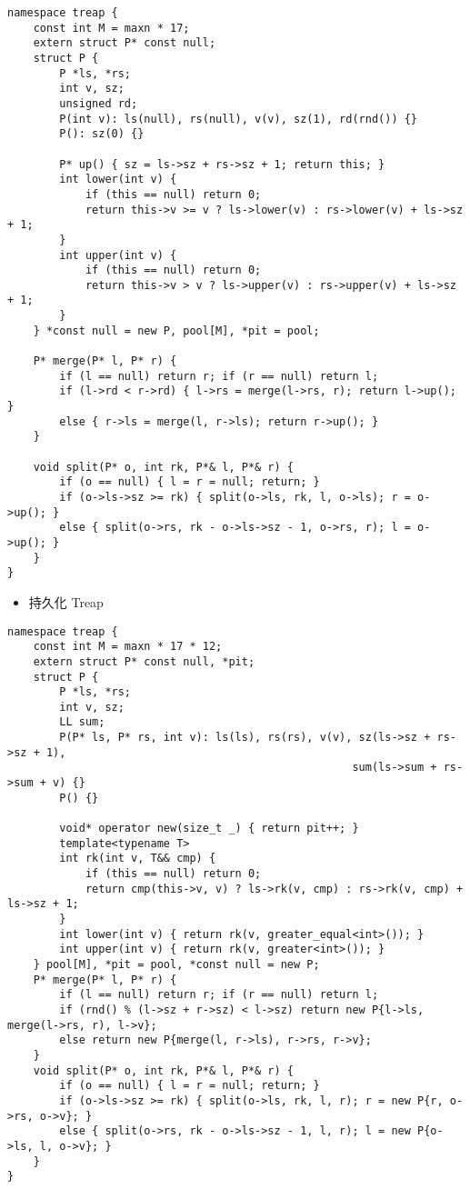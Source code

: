 \documentclass[]{article}
\providecommand{\tightlist}{%
  \setlength{\itemsep}{0pt}\setlength{\parskip}{0pt}}
\begin{document}
\begin{verbatim}
namespace treap {
    const int M = maxn * 17;
    extern struct P* const null;
    struct P {
        P *ls, *rs;
        int v, sz;
        unsigned rd;
        P(int v): ls(null), rs(null), v(v), sz(1), rd(rnd()) {}
        P(): sz(0) {}

        P* up() { sz = ls->sz + rs->sz + 1; return this; }
        int lower(int v) {
            if (this == null) return 0;
            return this->v >= v ? ls->lower(v) : rs->lower(v) + ls->sz + 1;
        }
        int upper(int v) {
            if (this == null) return 0;
            return this->v > v ? ls->upper(v) : rs->upper(v) + ls->sz + 1;
        }
    } *const null = new P, pool[M], *pit = pool;

    P* merge(P* l, P* r) {
        if (l == null) return r; if (r == null) return l;
        if (l->rd < r->rd) { l->rs = merge(l->rs, r); return l->up(); }
        else { r->ls = merge(l, r->ls); return r->up(); }
    }

    void split(P* o, int rk, P*& l, P*& r) {
        if (o == null) { l = r = null; return; }
        if (o->ls->sz >= rk) { split(o->ls, rk, l, o->ls); r = o->up(); }
        else { split(o->rs, rk - o->ls->sz - 1, o->rs, r); l = o->up(); }
    }
}
\end{verbatim}

\begin{itemize}
\tightlist
\item
  持久化 Treap
\end{itemize}

\begin{verbatim}
namespace treap {
    const int M = maxn * 17 * 12;
    extern struct P* const null, *pit;
    struct P {
        P *ls, *rs;
        int v, sz;
        LL sum;
        P(P* ls, P* rs, int v): ls(ls), rs(rs), v(v), sz(ls->sz + rs->sz + 1),
                                                     sum(ls->sum + rs->sum + v) {}
        P() {}

        void* operator new(size_t _) { return pit++; }
        template<typename T>
        int rk(int v, T&& cmp) {
            if (this == null) return 0;
            return cmp(this->v, v) ? ls->rk(v, cmp) : rs->rk(v, cmp) + ls->sz + 1;
        }
        int lower(int v) { return rk(v, greater_equal<int>()); }
        int upper(int v) { return rk(v, greater<int>()); }
    } pool[M], *pit = pool, *const null = new P;
    P* merge(P* l, P* r) {
        if (l == null) return r; if (r == null) return l;
        if (rnd() % (l->sz + r->sz) < l->sz) return new P{l->ls, merge(l->rs, r), l->v};
        else return new P{merge(l, r->ls), r->rs, r->v};
    }
    void split(P* o, int rk, P*& l, P*& r) {
        if (o == null) { l = r = null; return; }
        if (o->ls->sz >= rk) { split(o->ls, rk, l, r); r = new P{r, o->rs, o->v}; }
        else { split(o->rs, rk - o->ls->sz - 1, l, r); l = new P{o->ls, l, o->v}; }
    }
}
\end{verbatim}
\end{document}
